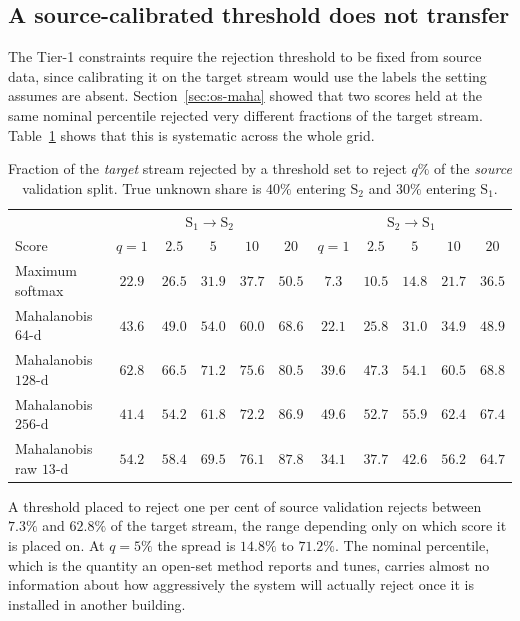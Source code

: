 \subsection{A source-calibrated threshold does not transfer}
\label{sec:os-threshold}

The Tier-1 constraints require the rejection threshold to be fixed from source data, since
calibrating it on the target stream would use the labels the setting assumes are absent.
Section~\ref{sec:os-maha} showed that two scores held at the same nominal percentile
rejected very different fractions of the target stream. Table~\ref{tab:osthresh} shows
that this is systematic across the whole grid.

\begin{table}[t]
\centering
\caption{Fraction of the \emph{target} stream rejected by a threshold set to reject $q\%$
of the \emph{source} validation split. True unknown share is $40\%$ entering
$\text{S}_2$ and $30\%$ entering $\text{S}_1$.}
\label{tab:osthresh}
\scriptsize
\begin{tabular}{@{}lccccc|ccccc@{}}
\toprule
 & \multicolumn{5}{c|}{$\text{S}_1\!\to\!\text{S}_2$} & \multicolumn{5}{c}{$\text{S}_2\!\to\!\text{S}_1$} \\
Score & $q{=}1$ & $2.5$ & $5$ & $10$ & $20$ & $q{=}1$ & $2.5$ & $5$ & $10$ & $20$ \\
\midrule
Maximum softmax & $22.9$ & $26.5$ & $31.9$ & $37.7$ & $50.5$ & $7.3$ & $10.5$ & $14.8$ & $21.7$ & $36.5$ \\
Mahalanobis $64$-d  & $43.6$ & $49.0$ & $54.0$ & $60.0$ & $68.6$ & $22.1$ & $25.8$ & $31.0$ & $34.9$ & $48.9$ \\
Mahalanobis $128$-d & $62.8$ & $66.5$ & $71.2$ & $75.6$ & $80.5$ & $39.6$ & $47.3$ & $54.1$ & $60.5$ & $68.8$ \\
Mahalanobis $256$-d & $41.4$ & $54.2$ & $61.8$ & $72.2$ & $86.9$ & $49.6$ & $52.7$ & $55.9$ & $62.4$ & $67.4$ \\
Mahalanobis raw $13$-d & $54.2$ & $58.4$ & $69.5$ & $76.1$ & $87.8$ & $34.1$ & $37.7$ & $42.6$ & $56.2$ & $64.7$ \\
\bottomrule
\end{tabular}
\end{table}

A threshold placed to reject one per cent of source validation rejects between $7.3\%$ and
$62.8\%$ of the target stream, the range depending only on which score it is placed on. At
$q=5\%$ the spread is $14.8\%$ to $71.2\%$. The nominal percentile, which is the quantity
an open-set method reports and tunes, carries almost no information about how aggressively
the system will actually reject once it is installed in another building.

